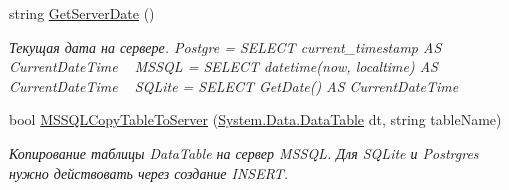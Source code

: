 \begin{DoxyCompactItemize}
string \mbox{\hyperlink{class_f_b_a_1_1_connection_a55e0e003b04b9ee54c49e47a6cebf0b4}{Get\+Server\+Date}} ()
\begin{DoxyCompactList}\small\item\em Текущая дата на сервере. Postgre = S\+E\+L\+E\+CT current\+\_\+timestamp AS Current\+Date\+Time ~\newline
M\+S\+S\+QL = S\+E\+L\+E\+CT datetime(\textquotesingle{}now\textquotesingle{}, \textquotesingle{}localtime\textquotesingle{}) AS Current\+Date\+Time ~\newline
S\+Q\+Lite = S\+E\+L\+E\+CT Get\+Date() AS Current\+Date\+Time \end{DoxyCompactList}\item 
bool \mbox{\hyperlink{class_f_b_a_1_1_connection_a2639fc83e1f04830b26312cdd19b5948}{M\+S\+S\+Q\+L\+Copy\+Table\+To\+Server}} (\mbox{\hyperlink{_sys_static_8cs_a6542cfcff2f8e81f06ade15aa0bfe2b7}{System.\+Data.\+Data\+Table}} dt, string table\+Name)
\begin{DoxyCompactList}\small\item\em Копирование таблицы Data\+Table на сервер M\+S\+S\+QL. Для S\+Q\+Lite и Postrgres нужно действовать через создание I\+N\+S\+E\+RT. \end{DoxyCompactList}\end{DoxyCompactItemize}

